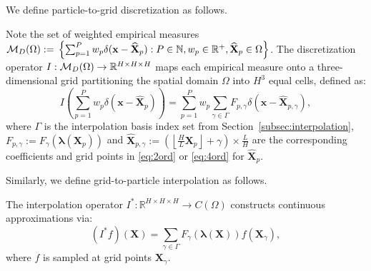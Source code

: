 \documentclass[review,onefignum,onetabnum]{siamart250211}
\begin{document}
We define particle-to-grid discretization as follows.
\begin{definition}
\label{def:particle2grid}
Note the set of weighted empirical measures \(\mathcal{M}_D(\Omega):=\\ \left\{\sum_{p=1}^{P} w_p \delta(\mathbf{x}-\widehat{\mathbf{X}}_p):P \in \mathbb{N},w_p \in \mathbb{R}^+,\widehat{\mathbf{X}}_p \in \Omega\right\}\). The discretization operator \( I:\\ \mathcal{M}_D(\Omega) \to \mathbb{R}^{H\times H\times H} \) maps each empirical measure onto a three-dimensional grid partitioning the spatial domain $\Omega$ into $H^3$ equal cells, defined as:
\begin{equation}
    I(\sum_{p=1}^{P} w_p \delta(\mathbf{x}-\widehat{\mathbf{X}}_p)) = \sum_{p=1}^{P} w_p \sum_{\gamma \in \Gamma} F_{p,\gamma} \delta(\mathbf{x}-\widehat{\mathbf{X}}_{p,\gamma}),
\end{equation}
where \( \Gamma \) is the interpolation basis index set from Section~\ref{subsec:interpolation}, \( F_{p,\gamma}:=F_\gamma (\boldsymbol{\lambda}(\mathbf{X}_p))\) and \(\widehat{\mathbf{X}}_{p,\gamma}:=\left( \left\lfloor \frac{H}{L} \mathbf{X}_p \right\rfloor + {\gamma} \right) \times \frac{L}{H}\) are the corresponding coefficients and grid points in \eqref{eq:2ord} or \eqref{eq:4ord} for \(\widehat{\mathbf{X}}_p\).
\end{definition}


Similarly, we define grid-to-particle interpolation as follows.
\begin{definition}
\label{def:grid2particle}
The interpolation operator \( I^*: \mathbb{R}^{H\times H\times H} \to C(\Omega) \) constructs continuous approximations via:
\begin{equation}
    (I^* f)(\mathbf{X}) = \sum_{\gamma \in \Gamma} F_\gamma (\boldsymbol{\lambda}(\mathbf{X}))f(\mathbf{X}_\gamma),
\end{equation} 
where \( f \) is sampled at grid points \( \mathbf{X}_\gamma \).
\end{definition}
\end{document}
